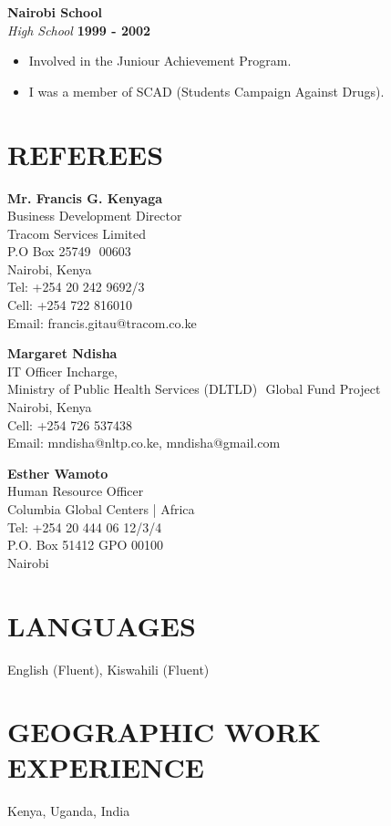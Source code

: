 \documentclass{res}
\begin{document}
\begin{resume}
\vspace{8pt}
\textbf{Nairobi School}  \\
\emph{High School} \hfill \textbf{1999 - 2002}
    \begin{itemize} \itemsep -2pt %
        \item Involved in the Juniour Achievement Program.
        \item I was a member of SCAD (Students Campaign Against Drugs).
    \end{itemize}


\section{REFEREES}
\vspace{8pt}
\textbf{Mr. Francis G. Kenyaga}  \\
Business Development  Director  \\
Tracom Services Limited  \\
P.O Box 25749 ­ 00603 \\
Nairobi, Kenya \\
Tel: +254 20 242 9692/3 \\
Cell: +254 722 816010 \\
Email: francis.gitau@tracom.co.ke

\textbf{Margaret Ndisha} \\
IT Officer In­charge,  \\
Ministry of Public Health Services (DLTLD) ­ Global Fund Project  \\
Nairobi, Kenya  \\
Cell: +254 726 537438  \\
E­mail: mndisha@nltp.co.ke,  mndisha@gmail.com

\textbf{Esther Wamoto}  \\
Human Resource Officer  \\
Columbia Global Centers | Africa  \\
Tel: +254 20 444 06 12/3/4  \\
P.O. Box  51412 GPO 00100  \\
Nairobi

\section{LANGUAGES}
\vspace{8pt}
English (Fluent), Kiswahili (Fluent)

\section{GEOGRAPHIC WORK EXPERIENCE}
\vspace{8pt}
Kenya, Uganda, India

\end{resume}
\end{document}
